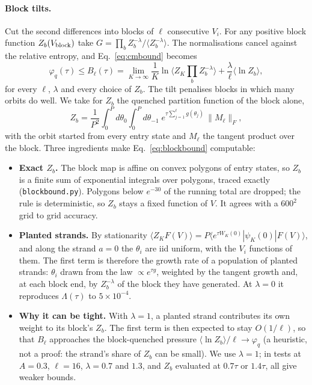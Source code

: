\documentclass[10pt,a4paper]{article}
\begin{document}
\paragraph{Block tilts.}
Cut the second differences into blocks of $\ell$ consecutive $V_i$. For any positive block function $Z_b(V_{\rm block})$ take $G=\prod_bZ_b^{-\lambda}/\langle Z_b^{-\lambda}\rangle$. The normalisations cancel against the relative entropy, and Eq.~\eqref{eq:cmbound} becomes
\begin{equation}
\varphi_q(\tau)\le B_\ell(\tau)=\lim_{K\to\infty}\frac1K\ln\Big\langle Z_K\prod_bZ_b^{-\lambda}\Big\rangle+\frac{\lambda}{\ell}\langle\ln Z_b\rangle ,
\label{eq:blockbound}
\end{equation}
for every $\ell$, $\lambda$ and every choice of $Z_b$. The tilt penalises blocks in which many orbits do well. We take for $Z_b$ the quenched partition function of the block alone,
\[
Z_b=\frac1{P^2}\int_0^P\!\!d\theta_0\int_0^P\!\!d\theta_{-1}\;e^{\tau\sum_{j=1}^{\ell}g(\theta_j)}\,\|M_\ell\|_F ,
\]
with the orbit started from every entry state and $M_\ell$ the tangent product over the block. Three ingredients make Eq.~\eqref{eq:blockbound} computable:
\begin{itemize}
\item \textbf{Exact $Z_b$.} The block map is affine on convex polygons of entry states, so $Z_b$ is a finite sum of exponential integrals over polygons, traced exactly (\texttt{blockbound.py}). Polygons below $e^{-30}$ of the running total are dropped; the rule is deterministic, so $Z_b$ stays a fixed function of $V$. It agrees with a $600^2$ grid to grid accuracy.
\item \textbf{Planted strands.} By stationarity $\langle Z_KF(V)\rangle=P\langle e^{\tau W_K(0)}|\psi_K(0)|F(V)\rangle$, and along the strand $a=0$ the $\theta_i$ are iid uniform, with the $V_i$ functions of them. The first term is therefore the growth rate of a population of planted strands: $\theta_i$ drawn from the law $\propto e^{\tau g}$, weighted by the tangent growth and, at each block end, by $Z_b^{-\lambda}$ of the block they have generated. At $\lambda=0$ it reproduces $\Lambda(\tau)$ to $5\times10^{-4}$.
\item \textbf{Why it can be tight.} With $\lambda=1$, a planted strand contributes its own weight to its block's $Z_b$. The first term is then expected to stay $O(1/\ell)$, so that $B_\ell$ approaches the block-quenched pressure $\langle\ln Z_b\rangle/\ell\to\varphi_q$ (a heuristic, not a proof: the strand's share of $Z_b$ can be small). We use $\lambda=1$; in tests at $A=0.3$, $\ell=16$, $\lambda=0.7$ and $1.3$, and $Z_b$ evaluated at $0.7\tau$ or $1.4\tau$, all give weaker bounds.
\end{itemize}
\end{document}

